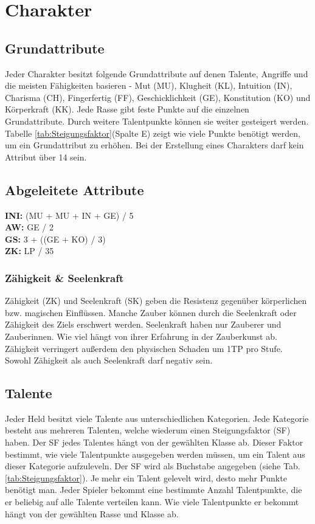 {\let\clearpage\relax\chapter{Charakter}}
\section{Grundattribute}
Jeder Charakter besitzt folgende Grundattribute auf denen Talente, Angriffe und die meisten Fähigkeiten basieren - Mut (MU), Klugheit (KL), Intuition (IN), Charisma (CH), Fingerfertig (FF), Geschicklichkeit (GE), Konstitution (KO) und Körperkraft (KK). Jede Rasse gibt feste Punkte auf die einzelnen Grundattribute. Durch weitere Talentpunkte können sie weiter gesteigert werden. Tabelle \ref{tab:Steigungsfaktor}(Spalte E) zeigt wie viele Punkte benötigt werden, um ein Grundattribut zu erhöhen. Bei der Erstellung eines Charakters darf kein Attribut über 14 sein.

\section{Abgeleitete Attribute}

\textbf{INI:} (MU + MU + IN + GE) / 5\\
\textbf{AW:} GE / 2\\
\textbf{GS:} 3 + ((GE + KO) / 3) \\
\textbf{ZK:} LP / 35

\subsection{Zähigkeit \& Seelenkraft}
Zähigkeit (ZK) und Seelenkraft (SK) geben die Resistenz gegenüber körperlichen bzw. magischen Einflüssen. Manche Zauber können durch die Seelenkraft oder Zähigkeit des Ziels erschwert werden. Seelenkraft haben nur Zauberer und Zauberinnen. Wie viel hängt von ihrer Erfahrung in der Zauberkunst ab. Zähigkeit verringert außerdem den physischen Schaden um 1TP pro Stufe. Sowohl Zähigkeit als auch Seelenkraft darf negativ sein.

\section{Talente}
Jeder Held besitzt viele Talente aus unterschiedlichen Kategorien. Jede Kategorie besteht aus mehreren Talenten, welche wiederum einen Steigungsfaktor (SF) haben. Der SF jedes Talentes hängt von der gewählten Klasse ab. Dieser Faktor bestimmt, wie viele Talentpunkte ausgegeben werden müssen, um ein Talent aus dieser Kategorie aufzuleveln. Der SF wird als Buchstabe angegeben (siehe Tab. \ref{tab:Steigungsfaktor}). Je mehr ein Talent gelevelt wird, desto mehr Punkte benötigt man. Jeder Spieler bekommt eine bestimmte Anzahl Talentpunkte, die er beliebig auf alle Talente verteilen kann. Wie viele Talentpunkte er bekommt hängt von der gewählten Rasse und Klasse ab.
 
